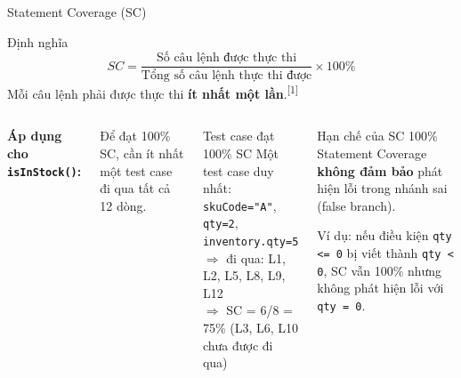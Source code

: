 \documentclass[aspectratio=169,12pt]{beamer}
\newcommand{\sref}[1]{\textsuperscript{\scriptsize[#1]}}
\begin{document}
\begin{frame}[shrink=12]{Statement Coverage (SC)}
  \begin{block}{Định nghĩa}
    \[
      SC = \frac{\text{Số câu lệnh được thực thi}}{\text{Tổng số câu lệnh thực thi được}} \times 100\%
    \]
    Mỗi câu lệnh phải được thực thi \textbf{ít nhất một lần}.\sref{1}
  \end{block}

  \vspace{0.4em}
  \begin{columns}
    \textbf{Áp dụng cho \texttt{isInStock()}:}

    Để đạt 100\% SC, cần ít nhất một test case đi qua tất cả
    12 dòng.

    \vspace{0.3em}
    \begin{exampleblock}{Test case đạt 100\% SC}
      Một test case duy nhất:\\
      \texttt{skuCode="A"}, \texttt{qty=2},
      \texttt{inventory.qty=5}\\
      $\Rightarrow$ đi qua: L1, L2, L5, L8, L9, L12\\
      $\Rightarrow$ SC = 6/8 = 75\% (L3, L6, L10 chưa được đi qua)
    \end{exampleblock}

    \begin{alertblock}{Hạn chế của SC}
      100\% Statement Coverage \textbf{không đảm bảo} phát hiện lỗi
      trong nhánh sai (false branch).

      \vspace{0.3em}
      Ví dụ: nếu điều kiện \texttt{qty <= 0} bị viết thành
      \texttt{qty < 0}, SC vẫn 100\% nhưng không phát hiện lỗi
      với \texttt{qty = 0}.
    \end{alertblock}
  \end{columns}
\end{frame}
\end{document}
